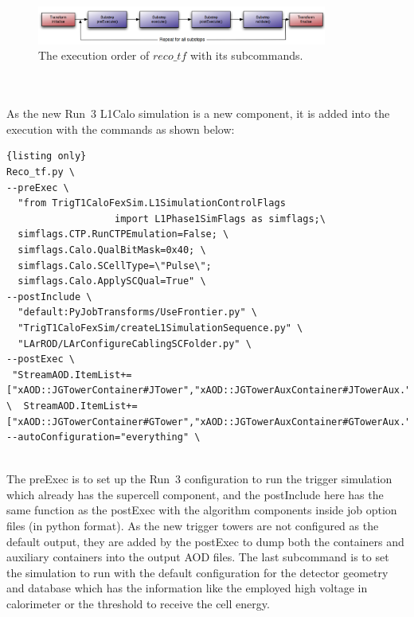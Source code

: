 \begin{figure}[!h]                
	\includegraphics[width=0.85\textwidth]{Chapter6/exeOrder.png}
	\begin{center}
		\caption{The execution order of $reco\_tf$ with its subcommands\cite{Stewart:2014ida}.}
		\label{Fig:exeOrder}            
	\end{center}
\end{figure}
\\
\\As the new Run~3 L1Calo simulation is a new component, it is added into the execution with the commands as shown below:
\begin{lstlisting}{listing only}
Reco_tf.py \
--preExec \
  "from TrigT1CaloFexSim.L1SimulationControlFlags 
                   import L1Phase1SimFlags as simflags;\ 
  simflags.CTP.RunCTPEmulation=False; \
  simflags.Calo.QualBitMask=0x40; \
  simflags.Calo.SCellType=\"Pulse\";
  simflags.Calo.ApplySCQual=True" \
--postInclude \
  "default:PyJobTransforms/UseFrontier.py" \
  "TrigT1CaloFexSim/createL1SimulationSequence.py" \
  "LArROD/LArConfigureCablingSCFolder.py" \
--postExec \
 "StreamAOD.ItemList+=["xAOD::JGTowerContainer#JTower","xAOD::JGTowerAuxContainer#JTowerAux."]; \  StreamAOD.ItemList+=["xAOD::JGTowerContainer#GTower","xAOD::JGTowerAuxContainer#GTowerAux."]";
--autoConfiguration="everything" \
\end{lstlisting}
\noindent
\\The preExec is to set up the Run~3 configuration to run the trigger simulation which already has the supercell component, and the postInclude here has the same function as the postExec with the algorithm components inside job option files (in python format). As the new trigger towers are not configured as the default output, they are added by the postExec to dump both the containers and auxiliary containers into the output AOD files. The last subcommand is to set the simulation to run with the default configuration for the detector geometry and database which has the information like the employed high voltage in calorimeter or the threshold to receive the cell energy. 